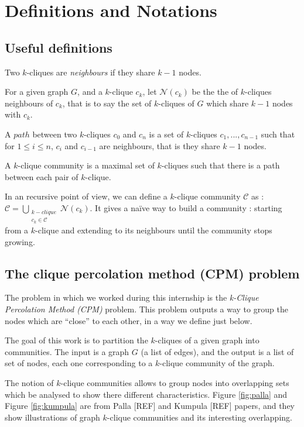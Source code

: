 \section{Definitions and Notations}
\label{sec:preliminaries}

\subsection{Useful definitions}

Two $k$-cliques are \emph{neighbours} if they share $k-1$ nodes.

For a given graph $G$, and a $k$-clique $c_k$, let $\mathcal{N}(c_k)$ be the the of $k$-cliques neighbours of $c_k$, that is to say the set of $k$-cliques of $G$ which share $k-1$ nodes with $c_k$.

A $path$ between two $k$-cliques $c_0$ and $c_n$ is a set of $k$-cliques $c_1, ..., c_{n-1}$ such that for $1 \leq i \leq n$, $c_i$ and $c_{i-1}$ are neighbours, that is they share $k-1$ nodes.

A $k$-clique community is a maximal set of $k$-cliques such that there is a path between each pair of $k$-clique.

In an recursive point of view, we can define a $k$-clique community $\mathcal{C}$ as : $\mathcal{C} = \underset{\substack{k-clique \\ c_k \in \mathcal{C}}}{\bigcup} \mathcal{N}(c_k)$. It gives a naïve way to build a community : starting from a $k$-clique and extending to its neighbours until the community stops growing.

\subsection{The clique percolation method (CPM) problem}
\label{subsec:defcpm}

The problem in which we worked during this internship is the \emph{k-Clique Percolation Method (CPM)} problem. This problem outputs a way to group the nodes which are ``close'' to each other, in a way we define just below.

The goal of this work is to partition the $k$-cliques of a given graph into communities. The input is a graph $G$ (a list of edges), and the output is a list of set of nodes, each one corresponding to a $k$-clique community of the graph.

The notion of $k$-clique communities allows to group nodes into overlapping sets which be analysed to show there different characteristics. Figure \ref{fig:palla} and Figure \ref{fig:kumpula} are from Palla [REF] and Kumpula [REF] papers, and they show illustrations of graph $k$-clique communities and its interesting overlapping.

